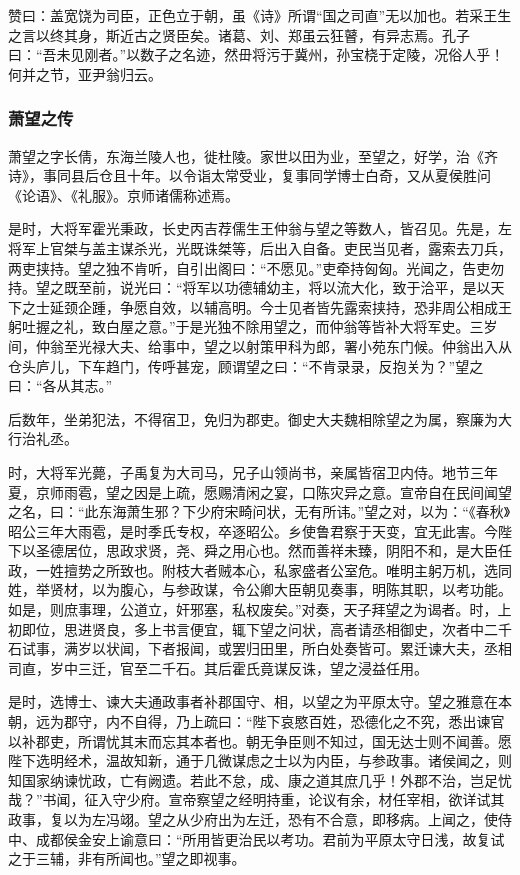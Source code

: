 \documentclass[]{article}
\begin{document}
赞曰：盖宽饶为司臣，正色立于朝，虽《诗》所谓``国之司直''无以加也。若采王生之言以终其身，斯近古之贤臣矣。诸葛、刘、郑虽云狂瞽，有异志焉。孔子曰：``吾未见刚者。''以数子之名迹，然毌将污于冀州，孙宝桡于定陵，况俗人乎！何并之节，亚尹翁归云。

\hypertarget{header-n5509}{%
\subsubsection{萧望之传}\label{header-n5509}}

萧望之字长倩，东海兰陵人也，徙杜陵。家世以田为业，至望之，好学，治《齐诗》，事同县后仓且十年。以令诣太常受业，复事同学博士白奇，又从夏侯胜问《论语》、《礼服》。京师诸儒称述焉。

是时，大将军霍光秉政，长史丙吉荐儒生王仲翁与望之等数人，皆召见。先是，左将军上官桀与盖主谋杀光，光既诛桀等，后出入自备。吏民当见者，露索去刀兵，两吏挟持。望之独不肯听，自引出阁曰：``不愿见。''吏牵持匈匈。光闻之，告吏勿持。望之既至前，说光曰：``将军以功德辅幼主，将以流大化，致于洽平，是以天下之士延颈企踵，争愿自效，以辅高明。今士见者皆先露索挟持，恐非周公相成王躬吐握之礼，致白屋之意。''于是光独不除用望之，而仲翁等皆补大将军史。三岁间，仲翁至光禄大夫、给事中，望之以射策甲科为郎，署小苑东门候。仲翁出入从仓头庐儿，下车趋门，传呼甚宠，顾谓望之曰：``不肯录录，反抱关为？''望之曰：``各从其志。''

后数年，坐弟犯法，不得宿卫，免归为郡吏。御史大夫魏相除望之为属，察廉为大行治礼丞。

时，大将军光薨，子禹复为大司马，兄子山领尚书，亲属皆宿卫内侍。地节三年夏，京师雨雹，望之因是上疏，愿赐清闲之宴，口陈灾异之意。宣帝自在民间闻望之名，曰：``此东海萧生邪？下少府宋畸问状，无有所讳。''望之对，以为：``《春秋》昭公三年大雨雹，是时季氏专权，卒逐昭公。乡使鲁君察于天变，宜无此害。今陛下以圣德居位，思政求贤，尧、舜之用心也。然而善祥未臻，阴阳不和，是大臣任政，一姓擅势之所致也。附枝大者贼本心，私家盛者公室危。唯明主躬万机，选同姓，举贤材，以为腹心，与参政谋，令公卿大臣朝见奏事，明陈其职，以考功能。如是，则庶事理，公道立，奸邪塞，私权废矣。''对奏，天子拜望之为谒者。时，上初即位，思进贤良，多上书言便宜，辄下望之问状，高者请丞相御史，次者中二千石试事，满岁以状闻，下者报闻，或罢归田里，所白处奏皆可。累迁谏大夫，丞相司直，岁中三迁，官至二千石。其后霍氏竟谋反诛，望之浸益任用。

是时，选博士、谏大夫通政事者补郡国守、相，以望之为平原太守。望之雅意在本朝，远为郡守，内不自得，乃上疏曰：``陛下哀愍百姓，恐德化之不究，悉出谏官以补郡吏，所谓忧其末而忘其本者也。朝无争臣则不知过，国无达士则不闻善。愿陛下选明经术，温故知新，通于几微谋虑之士以为内臣，与参政事。诸侯闻之，则知国家纳谏忧政，亡有阙遗。若此不怠，成、康之道其庶几乎！外郡不治，岂足忧哉？''书闻，征入守少府。宣帝察望之经明持重，论议有余，材任宰相，欲详试其政事，复以为左冯翊。望之从少府出为左迁，恐有不合意，即移病。上闻之，使侍中、成都侯金安上谕意曰：``所用皆更治民以考功。君前为平原太守日浅，故复试之于三辅，非有所闻也。''望之即视事。
\end{document}
